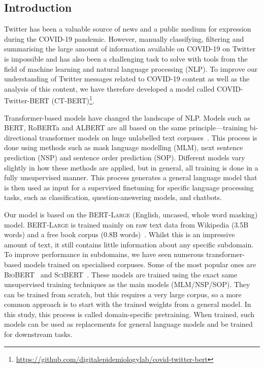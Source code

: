 \documentclass{article}
\begin{document}
\begin{multicols}{2}
\section{Introduction}
\label{sec:introduction}
Twitter has been a valuable source of news and a public medium for expression during the COVID-19 pandemic.
However, manually classifying, filtering and summarising the large amount of information available on COVID-19 on Twitter is impossible and has also been a challenging task to solve with tools from the field of machine learning and natural language processing (NLP).
To improve our understanding of Twitter messages related to COVID-19 content as well as the analysis of this content, we have therefore developed a model called COVID-Twitter-BERT (\textsc{CT-BERT})\footnote{\url{https://github.com/digitalepidemiologylab/covid-twitter-bert}}.

Transformer-based models have changed the landscape of NLP.
Models such as BERT, RoBERTa and ALBERT are all based on the same principle—training bi-directional transformer models on huge unlabelled text corpuses~\cite{vaswani2017attention,devlin2018bert,liu2019roberta,lan2019albert}.
This process is done using methods such as mask language modelling (MLM), next sentence prediction (NSP) and sentence order prediction (SOP).
Different models vary slightly in how these methods are applied, but in general, all training is done in a fully unsupervised manner.
This process generates a general language model that is then used as input for a supervised finetuning for specific language processing tasks, such as classification, question-answering models, and chatbots.\par

Our model is based on the \textsc{BERT-Large} (English, uncased, whole word masking) model.
\textsc{BERT-Large} is trained mainly on raw text data from Wikipedia (3.5B words) and a free book corpus (0.8B words)~\cite{devlin2018bert}.
Whilst this is an impressive amount of text, it still contains little information about any specific subdomain.
To improve performance in subdomains, we have seen numerous transformer-based models trained on specialised corpuses.
  Some of the most popular ones are \textsc{BioBERT}~\cite{lee2020biobert} and \textsc{SciBERT}~\cite{beltagy2019scibert}.
These models are trained using the exact same unsupervised training techniques as the main models (MLM/NSP/SOP).
They can be trained from scratch, but this requires a very large corpus, so a more common approach is to start with the trained weights from a general model.
In this study, this process is called domain-specific pretraining.
When trained, such models can be used as replacements for general language models and be trained for downstream tasks.


\end{multicols}
\end{document}
